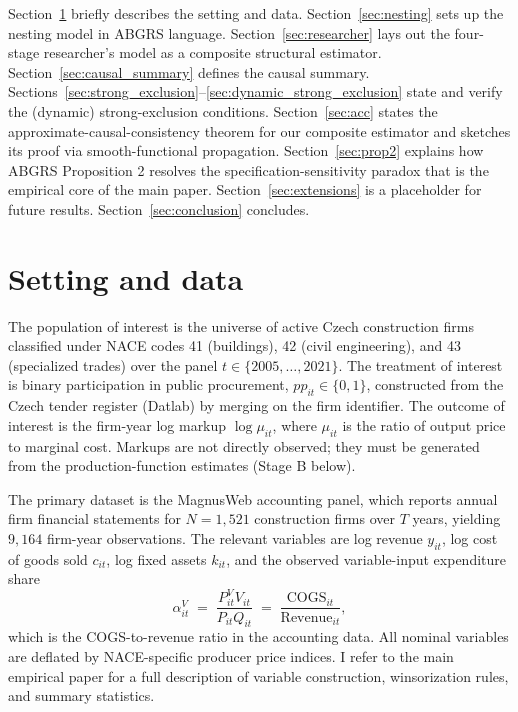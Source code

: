 \documentclass[11pt]{article}
\begin{document}
Section~\ref{sec:setting} briefly describes the setting and data. Section~\ref{sec:nesting} sets up the nesting model in ABGRS language. Section~\ref{sec:researcher} lays out the four-stage researcher's model as a composite structural estimator. Section~\ref{sec:causal_summary} defines the causal summary. Sections~\ref{sec:strong_exclusion}--\ref{sec:dynamic_strong_exclusion} state and verify the (dynamic) strong-exclusion conditions. Section~\ref{sec:acc} states the approximate-causal-consistency theorem for our composite estimator and sketches its proof via smooth-functional propagation. Section~\ref{sec:prop2} explains how ABGRS Proposition 2 resolves the specification-sensitivity paradox that is the empirical core of the main paper. Section~\ref{sec:extensions} is a placeholder for future results. Section~\ref{sec:conclusion} concludes.

\section{Setting and data}\label{sec:setting}

The population of interest is the universe of active Czech construction firms classified under NACE codes 41 (buildings), 42 (civil engineering), and 43 (specialized trades) over the panel $t \in \{2005,\ldots,2021\}$. The treatment of interest is binary participation in public procurement, $pp_{it} \in \{0,1\}$, constructed from the Czech tender register (Datlab) by merging on the firm identifier. The outcome of interest is the firm-year log markup $\log\mu_{it}$, where $\mu_{it}$ is the ratio of output price to marginal cost. Markups are not directly observed; they must be generated from the production-function estimates (Stage B below).

The primary dataset is the MagnusWeb accounting panel, which reports annual firm financial statements for $N=1{,}521$ construction firms over $T$ years, yielding $9{,}164$ firm-year observations. The relevant variables are log revenue $y_{it}$, log cost of goods sold $c_{it}$, log fixed assets $k_{it}$, and the observed variable-input expenditure share
\begin{equation}\label{eq:alpha}
\alpha^V_{it} \;=\; \frac{P^V_{it}V_{it}}{P_{it}Q_{it}}\;=\; \frac{\text{COGS}_{it}}{\text{Revenue}_{it}},
\end{equation}
which is the COGS-to-revenue ratio in the accounting data. All nominal variables are deflated by NACE-specific producer price indices. I refer to the main empirical paper for a full description of variable construction, winsorization rules, and summary statistics.
\end{document}
